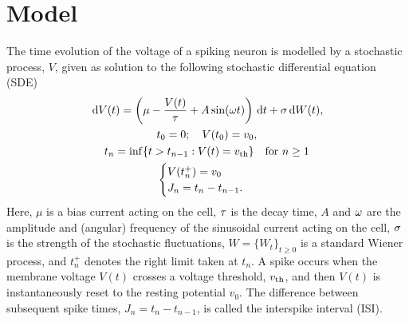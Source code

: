 \section{Model}
The time evolution of the voltage of a spiking neuron is modelled by a
stochastic process, $V$, given as solution to the following stochastic
differential equation (SDE)
\begin{equation}
\begin{gathered}
\, \mathrm{d} V(t) = \left({\mu } - \frac{V(t)}{{\tau}} +  A \sin({\omega} t ) \right) \, \mathrm{d} t + \sigma
\, \mathrm{d} W(t),
\\
t_0 = 0; \quad V(t_0) = v_0,
\\
t_{n } = \inf \{ t > t_{n-1} : V(t) = { v_{\textrm{th} } } \} \quad \text{for } n \geq 1
\\
\begin{cases}
V(t_n^+) = v_0 &  
\\
J_n = t_n-t_{n-1} .
\end{cases}
\end{gathered}
\label{eq:v_evolution_uo}
\end{equation}
Here, $\mu$ is a bias current acting on the cell, ${\tau}$ is the decay time, $A$
and ${\omega}$ are the amplitude and (angular) frequency of the sinusoidal current
acting on the cell, $\sigma$ is the strength of the stochastic fluctuations, $W =
\{W_t\}_{t\geq0}$ is a standard Wiener process, and $t_n^+$ denotes the right
limit taken at $t_n$. A spike occurs when the membrane voltage $V(t)$ crosses a
voltage threshold, ${ v_{\textrm{th} } }$, and then $V(t)$ is instantaneously reset to the
resting potential $v_0$. The difference between subsequent spike times, $J_n =
t_{n} - t_{n-1}$, is called the interspike interval (ISI).

